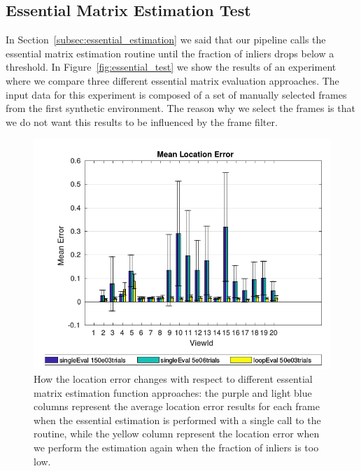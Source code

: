 \subsection{Essential Matrix Estimation Test}\label{subsec:essential_test}
In Section~\ref{subsec:essential_estimation} we said that our pipeline
calls the essential matrix estimation routine until the fraction of inliers
drops below a threshold. In Figure~\ref{fig:essential_test} we show the
results of an experiment where we compare three different essential matrix
evaluation approaches. The input data for this experiment is composed of
a set of manually selected frames from the first synthetic environment.
The reason why we select the frames is that we do not want this results to be
influenced by the frame filter.
%
\begin{figure}[h]
\centering
\includegraphics[width=\linewidth]{img/essentialEstimation.png}
\caption{How the location error changes with respect to different essential
matrix estimation function approaches: the purple and light blue columns
represent the average location error results for each frame when the
essential estimation is performed with a single call to the routine, while the
yellow column represent the location error when we perform the estimation
again when the fraction of inliers is too low.}
\label{fig:sumAbsLocError}
\end{figure}

